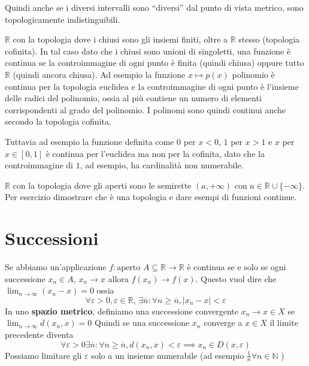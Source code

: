 Quindi anche se i diversi intervalli sono ``diversi'' dal punto di vista
metrico, sono topologicamente indistinguibili.
\begin{example}
    \(\mathbb{R}\) con la topologia dove i chiusi sono gli insiemi finiti, oltre
    a \(\mathbb{R}\) stesso (topologia cofinita). In tal caso dato che i chiusi
    sono unioni di singoletti, una funzione è continua se la controimmagine di
    ogni punto è finita (quindi chiusa) oppure tutto \(\mathbb{R}\) (quindi
    ancora chiusa). Ad esempio la funzione \(x \mapsto p(x)\) polinomio è
    continua per la topologia euclidea e la controimmagine di ogni punto è
    l'insieme delle radici del polinomio, ossia al più contiene un numero di
    elementi corrispondenti al grado del polinomio. I polinomi sono quindi
    continui anche secondo la topologia cofinita.

    Tuttavia ad esempio la funzione definita come \(0\) per \(x < 0\), \(1\) per
    \(x > 1\) e \(x\) per \(x \in [0, 1]\) è continua per l'euclidea ma non per
    la cofinita, dato che la controimmagine di \(1\), ad esempio, ha cardinalità
    non numerabile.
\end{example}

\begin{example}
    \(\mathbb{R}\) con la topologia dove gli aperti sono le semirette \((a,
    +\infty)\) con \(a \in \mathbb{R} \cup \{-\infty\} \). Per esercizio
    dimostrare che è una topologia e dare esempi di funzioni continue.
\end{example}

\section{Successioni}
Se abbiamo un'applicazione \(f : \text{aperto }A \subseteq  \mathbb{R} \to  \mathbb{R}\) è
continua se e solo se ogni successione \(x_{n} \in A\), \(x_{n} \to  x\) allora
\(f(x_{n}) \to  f(x)\). Questo vuol dire che \(\lim_{n \to \infty}(x_{n} - x) =
0\) ossia 
\[
    \forall \varepsilon > 0, \varepsilon \in \mathbb{R}, \, \exists \overline{n}
    : \forall n \ge \overline{n}, |x_{n} - x| < \varepsilon
\]
In uno \textbf{spazio metrico}, definiamo una successione convergente 
\(x_{n} \to x \in X\) se \(\lim_{n \to  \infty} {d (x_{n}, x)} = 0\) 
Quindi se una successione \(x_{n}\) converge a \(x \in  X\) il limite precedente diventa
\[
    \forall  \varepsilon > 0 \exists  \overline{n} : \forall n \ge
    \overline{n}, d(x_{n}, x) < \varepsilon \implies x_{n} \in D(x, \varepsilon)
\]
Possiamo limitare gli \(\varepsilon\) solo a un insieme numerabile (ad esempio
\(\frac{1}{n} \forall  n \in \mathbb{N}\) )


